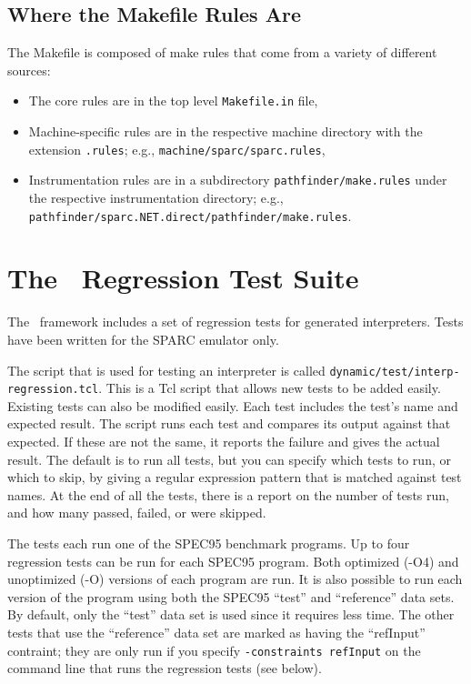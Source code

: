 {\subsection{Where the Makefile Rules Are} 
The Makefile is composed of make rules
that come from a variety of different sources:

\begin{itemize}
\item The core rules are in the top level \texttt{Makefile.in} file, 
\item Machine-specific rules are in the respective machine directory 
	with the extension \texttt{.rules};
      e.g., \texttt{machine/sparc/sparc.rules},
\item Instrumentation rules are in a subdirectory \texttt{pathfinder/make.rules}
	under the respective instrumentation directory; e.g.,
	\texttt{pathfinder/sparc.NET.direct/pathfinder/make.rules}. 
\end{itemize}


\section{The \walk\ Regression Test Suite}
The \walk\ framework includes a set of regression tests for
generated interpreters.
Tests have been written for the SPARC emulator only.

The script that is used for testing an interpreter is called 
\texttt{dynamic/test/interp-regression.tcl}.
This is a Tcl script that allows new tests to be added easily.
Existing tests can also be modified easily.
Each test includes the test's name and expected result.
The script runs each test and compares its output against that expected.
If these are not the same, it reports the failure and gives the actual result.
The default is to run all tests,
but you can specify which tests to run,
or which to skip, by giving a regular expression pattern
that is matched against test names.
At the end of all the tests, there is a report
on the number of tests run, and how many passed, failed, or were skipped.

The tests each run one of the SPEC95 benchmark programs.
Up to four regression tests can be run for each SPEC95 program.
Both optimized (-O4) and unoptimized (-O) versions of each program are run.
It is also possible to run each version of the program
using both the SPEC95 ``test'' and ``reference'' data sets.
By default, only the ``test'' data set is used
since it requires less time.
The other tests that use the ``reference'' data set
are marked as having the ``refInput'' contraint;
they are only run if you specify \texttt{-constraints refInput}
on the command line that runs the regression tests (see below).

}
